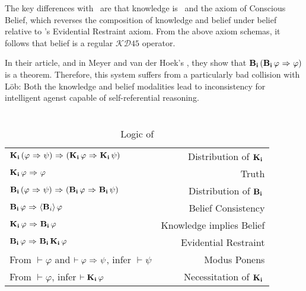 The key differences with \DASL\ are that knowledge is \SFive\ and the axiom of Conscious Belief, which reverses the composition of knowledge and belief under belief relative to \DASL's Evidential Restraint axiom. From the above axiom schemas, it follows that belief is a regular $\mathcal{KD}45$ operator.

In their article, and in Meyer and van der Hoek's \cite{MeyerHoek}, they show that $\mathbf{B}_{\mathbf{i}}\,(\mathbf{B}_{\mathbf{i}}\,\varphi {\ \Rightarrow \ } \varphi)$ is a theorem. Therefore, this system suffers from a particularly bad collision with L\"ob: Both the knowledge and belief modalities lead to inconsistency for intelligent agenst capable of self-referential reasoning. 

\section{\DASL}
\label{sec:crap}

\begin{table}[H]
	\begin{center}
		\begin{tabular}{| l r |}
			\hline
			$\mathbf{K}_{\mathbf{i}}\,(\varphi {\ \Rightarrow \ } \psi) {\ \Rightarrow \ } (\mathbf{K}_{\mathbf{i}}\,\varphi {\ \Rightarrow \ } \mathbf{K}_{\mathbf{i}}\,\psi)$ & Distribution of $\mathbf{K}_{\mathbf{i}}\,$ \\
			$\mathbf{K}_{\mathbf{i}}\,\varphi {\ \Rightarrow \ } \varphi$ & Truth \\
			$\mathbf{B}_{\mathbf{i}}\,(\varphi {\ \Rightarrow \ } \psi) {\ \Rightarrow \ } (\mathbf{B}_{\mathbf{i}}\,\varphi {\ \Rightarrow \ } \mathbf{B}_{\mathbf{i}}\,\psi)$ & Distribution of $\mathbf{B}_{\mathbf{i}}\,$\\
			$\mathbf{B}_{\mathbf{i}}\,\varphi {\ \Rightarrow \ } \langle \mathbf{B}_{i} \rangle\,\varphi$ & Belief Consistency \\
			$\mathbf{K}_{\mathbf{i}}\,\varphi {\ \Rightarrow \ } \mathbf{B}_{\mathbf{i}}\,\varphi$ & Knowledge implies Belief \\
			$\mathbf{B}_{\mathbf{i}}\,\varphi {\ \Rightarrow \ } \mathbf{B}_{\mathbf{i}}\,\mathbf{K}_{\mathbf{i}}\,\varphi$ & Evidential Restraint\\
			From $\vdash \varphi$ and $\vdash \varphi {\ \Rightarrow \ } \psi$, infer $\vdash\psi$ & Modus Ponens\\
			From $\vdash \varphi$, infer $\vdash \mathbf{K}_{\mathbf{i}}\,\varphi$ & Necessitation of $\mathbf{K}_{\mathbf{i}}\,$\\
			\hline
		\end{tabular}
		\caption{Logic of \DASL}~\label{GC_agent}
	\end{center}
\end{table}

